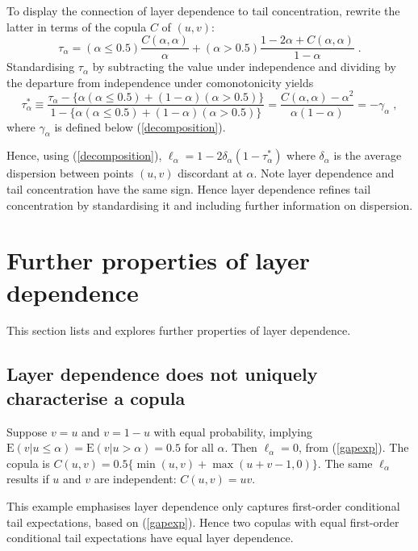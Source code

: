 \documentclass[authoryear]{elsarticle}
\newcommand{\E}{{\mathrm E}}
\newcommand{\eref}[1]{(\ref{#1})}
\begin{document}
To display the connection of layer dependence to tail concentration, rewrite the latter  in terms of the copula $C$ of $(u,v)$:
$$
\tau_\alpha = (\alpha\leq 0.5)\frac{C(\alpha,\alpha)}{\alpha}+(\alpha>0.5)\frac{1-2\alpha+C(\alpha,\alpha)}{1-\alpha} \;.
$$
Standardising $\tau_\alpha$ by subtracting the value under independence and dividing by the departure from independence under comonotonicity yields
$$
\tau_\alpha^* \equiv \frac{\tau_\alpha - \{\alpha(\alpha\leq 0.5)+(1-\alpha)(\alpha>0.5)\}}{1-\{\alpha(\alpha\leq 0.5)+(1-\alpha)(\alpha>0.5)\}}
=\frac{C(\alpha,\alpha)-\alpha^2}{\alpha(1-\alpha)} = -\gamma_\alpha \;,
$$
where $\gamma_\alpha$ is defined below \eref{decomposition}.

Hence, using \eref{decomposition}, $\ell_\alpha=1-2\delta_\alpha(1-\tau_\alpha^*)$ where $\delta_\alpha$ is the average dispersion between points $(u,v)$ discordant at $\alpha$. Note layer dependence and tail concentration have the same sign. Hence layer dependence refines tail concentration by standardising it and including further information on dispersion.


\section{Further properties of layer dependence}\label{sproperties}

This section lists and explores further properties of layer dependence.

\subsection{Layer dependence does not uniquely characterise a copula}

Suppose $v=u$ and $v=1-u$ with equal probability, implying $\E(v|u\leq \alpha)=\E(v|u>\alpha)=0.5$ for all $\alpha$. Then $\ell_\alpha=0$, from \eref{gapexp}. The copula is $C(u,v)=0.5\{\min(u,v)+\max(u+v-1,0)\}$. The same $\ell_\alpha$ results if $u$ and $v$ are independent: $C(u,v)=uv$.

This example emphasises layer dependence only captures first-order conditional tail expectations, based on \eref{gapexp}. Hence two copulas with equal first-order conditional tail expectations have equal layer dependence.
\end{document}
